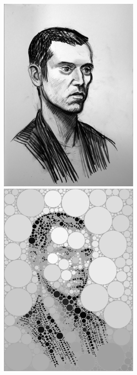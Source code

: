 \documentclass[12pt, a4paper]{article}
\begin{document}
\begin{center}
\begin{figure}[H]
\centering
\includegraphics[width=7cm]{./test05.png}
\includegraphics[width=7cm]{./out05.png}
\end{figure}
\end{center}
\end{document}
